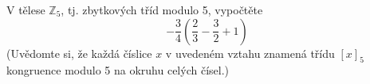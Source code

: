 \subsubsection{}
V tělese $\mathbb{Z}_{5}$, tj. zbytkových tříd modulo 5, vypočtěte
$$-\frac{3}{4}\left ( \frac{2}{3}-\frac{3}{2} +1\right )$$
(Uvědomte si, že každá číslice $x$ v uvedeném vztahu znamená třídu $\left [ x
\right ]_{5}$ kongruence modulo 5 na okruhu celých čísel.)

